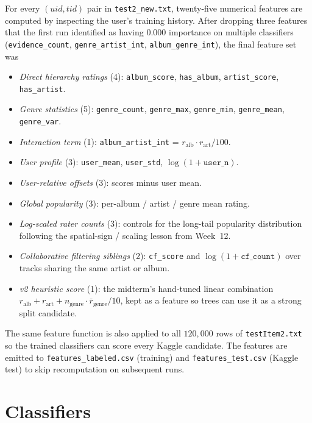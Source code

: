 \documentclass[12pt]{article}
\begin{document}
	For every $(uid, tid)$ pair in \texttt{test2\_new.txt}, twenty-five numerical features are computed by inspecting the user's training history. After dropping three features that the first run identified as having $0.000$ importance on multiple classifiers (\texttt{evidence\_count}, \texttt{genre\_artist\_int}, \texttt{album\_genre\_int}), the final feature set was

	\begin{itemize}
		\item \emph{Direct hierarchy ratings} (4): \texttt{album\_score}, \texttt{has\_album}, \texttt{artist\_score}, \texttt{has\_artist}.
		\item \emph{Genre statistics} (5): \texttt{genre\_count}, \texttt{genre\_max}, \texttt{genre\_min}, \texttt{genre\_mean}, \texttt{genre\_var}.
		\item \emph{Interaction term} (1): \texttt{album\_artist\_int} = $r_\text{alb}\cdot r_\text{art}/100$.
		\item \emph{User profile} (3): \texttt{user\_mean}, \texttt{user\_std}, $\log(1 + \texttt{user\_n})$.
		\item \emph{User-relative offsets} (3): scores minus user mean.
		\item \emph{Global popularity} (3): per-album / artist / genre mean rating.
		\item \emph{Log-scaled rater counts} (3): controls for the long-tail popularity distribution following the spatial-sign / scaling lesson from Week~12.
		\item \emph{Collaborative filtering siblings} (2): \texttt{cf\_score} and $\log(1 + \texttt{cf\_count})$ over tracks sharing the same artist or album.
		\item \emph{v2 heuristic score} (1): the midterm's hand-tuned linear combination $r_\text{alb} + r_\text{art} + n_\text{genre}\cdot\bar{r}_\text{genre}/10$, kept as a feature so trees can use it as a strong split candidate.
	\end{itemize}

	The same feature function is also applied to all $120{,}000$ rows of \texttt{testItem2.txt} so the trained classifiers can score every Kaggle candidate. The features are emitted to \texttt{features\_labeled.csv} (training) and \texttt{features\_test.csv} (Kaggle test) to skip recomputation on subsequent runs.

	\newpage
	\section{Classifiers}\label{sec:classifiers}
\end{document}
